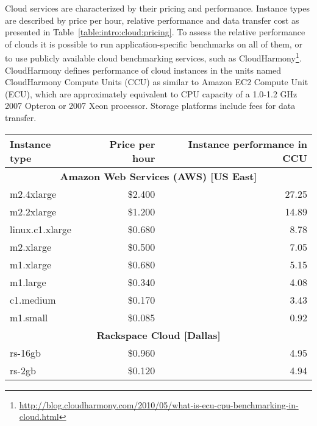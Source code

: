Cloud services are characterized by their pricing and performance. Instance types are described by price per hour, relative performance and data transfer cost as presented in Table~\ref{table:intro:cloud:pricing}. To assess the relative performance of clouds it is possible to run application-specific benchmarks on all of them, or to use publicly available cloud benchmarking services, such as CloudHarmony\footnote{\url{http://blog.cloudharmony.com/2010/05/what-is-ecu-cpu-benchmarking-in-cloud.html}}. CloudHarmony defines performance of cloud instances in the units named CloudHarmony Compute Units (CCU) as similar to Amazon EC2 Compute Unit (ECU), which are approximately equivalent to CPU capacity of a 1.0-1.2 GHz 2007 Opteron or 2007 Xeon processor. Storage platforms include fees for data transfer.

\begin{table}
  \centering
  \begin{tabular}{| l | r | r |}
    \hline
    \textbf{Instance type} & \textbf{Price per hour} & \textbf{Instance performance in CCU} \\ \hline
    \multicolumn{3}{|c|}{\textbf{Amazon Web Services (AWS) [US East]}}       \\ \hline
    m2.4xlarge        & \$2.400   & 27.25                                    \\ \hline
    m2.2xlarge        & \$1.200   & 14.89                                    \\ \hline
    linux.c1.xlarge   & \$0.680   & 8.78                                     \\ \hline
    m2.xlarge         & \$0.500   & 7.05                                     \\ \hline
    m1.xlarge         & \$0.680   & 5.15                                     \\ \hline
    m1.large          & \$0.340   & 4.08                                     \\ \hline
    c1.medium         & \$0.170   & 3.43                                     \\ \hline
    m1.small          & \$0.085   & 0.92                                     \\ \hline
    \multicolumn{3}{|c|}{\textbf{Rackspace Cloud [Dallas]}}                  \\ \hline
    rs-16gb           & \$0.960   & 4.95                                     \\ \hline
    rs-2gb            & \$0.120   & 4.94                                     \\ \hline

\end{tabular}
\end{table}
